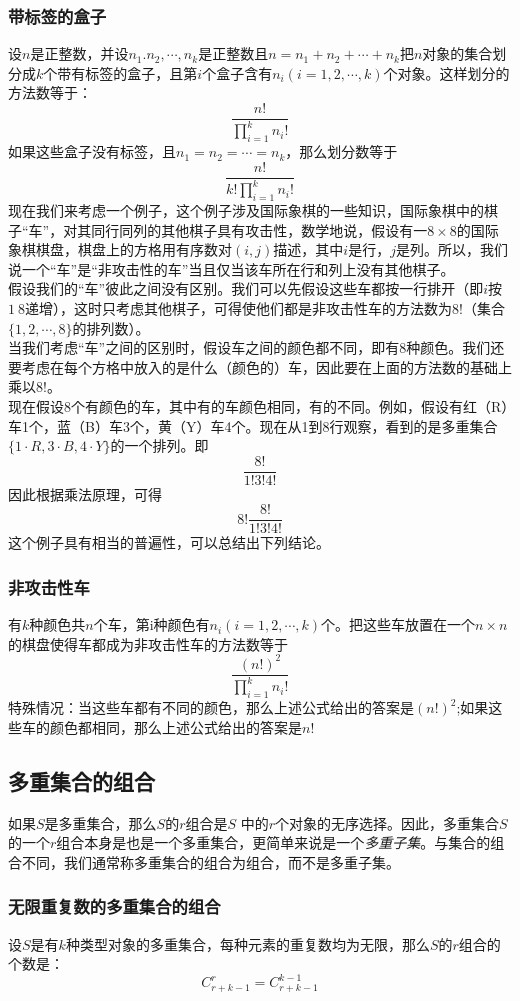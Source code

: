 \documentclass{ctexart}
\begin{document}
\subsubsection{带标签的盒子}设$n$是正整数，并设$n_1.n_2,\cdots,n_k$是正整数且$n = n_1 + n_2 + \cdots + n_k$把$n$对象的集合划分成$k$个带有标签的盒子，且第$i$个盒子含有$n_i(i = 1,2,\cdots,k)$个对象。这样划分的方法数等于：
\[\frac{n!}{\prod_{i=1}^k n_i!}\]
如果这些盒子没有标签，且$n_1 = n_2 = \cdots = n_k$，那么划分数等于
\[\frac{n!}{k!\prod_{i=1}^k n_i!}\]
现在我们来考虑一个例子，这个例子涉及国际象棋的一些知识，国际象棋中的棋子“车”，对其同行同列的其他棋子具有攻击性，数学地说，假设有一$8 \times 8$的国际象棋棋盘，棋盘上的方格用有序数对$(i,j)$描述，其中$i$是行，$j$是列。所以，我们说一个“车”是“非攻击性的车”当且仅当该车所在行和列上没有其他棋子。\\
假设我们的“车”彼此之间没有区别。我们可以先假设这些车都按一行排开（即$i$按$1~8$递增），这时只考虑其他棋子，可得使他们都是非攻击性车的方法数为$8!$（集合$\{1,2,\cdots,8\}$的排列数）。\\
当我们考虑“车”之间的区别时，假设车之间的颜色都不同，即有8种颜色。我们还要考虑在每个方格中放入的是什么（颜色的）车，因此要在上面的方法数的基础上乘以$8!$。\\
现在假设8个有颜色的车，其中有的车颜色相同，有的不同。例如，假设有红（R）车1个，蓝（B）车3个，黄（Y）车4个。现在从1到8行观察，看到的是多重集合$\{1 \cdot R, 3 \cdot B,4 \cdot Y\}$的一个排列。即
\[\frac{8!}{1!3!4!}\]
因此根据乘法原理，可得
\[8! \frac{8!}{1!3!4!} \]
这个例子具有相当的普遍性，可以总结出下列结论。
\subsubsection{非攻击性车}有$k$种颜色共$n$个车，第i种颜色有$n_i(i = 1,2,\cdots,k)$个。把这些车放置在一个$n \times n$的棋盘使得车都成为非攻击性车的方法数等于
\[\frac{(n!)^2}{\prod_{i=1}^k n_i!}\]
特殊情况：当这些车都有不同的颜色，那么上述公式给出的答案是$(n!)^2$;如果这些车的颜色都相同，那么上述公式给出的答案是$n!$
   \subsection{多重集合的组合}
   如果$S$是多重集合，那么$S$的$r$组合是$S$ 中的$r$个对象的无序选择。因此，多重集合$S$的一个$r$组合本身是也是一个多重集合，更简单来说是一个\textit{多重子集}。与集合的组合不同，我们通常称多重集合的组合为组合，而不是多重子集。
   \subsubsection{无限重复数的多重集合的组合}
   设$S$是有$k$种类型对象的多重集合，每种元素的重复数均为无限，那么$S$的$r$组合的个数是：
   \[C_{r+k-1}^r = C_{r+k-1}^{k-1}\]
\end{document}
